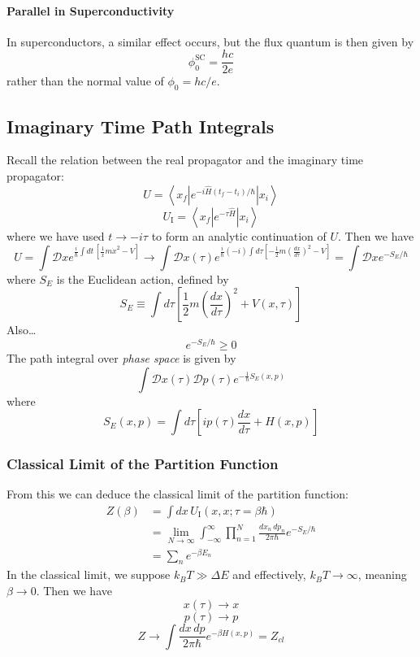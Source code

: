 \documentclass{article}
\begin{document}
	\paragraph{Parallel in Superconductivity} In superconductors, a similar effect occurs, but the flux quantum is then given by
	$$\phi_0^{\mathrm{SC}}=\frac{hc}{2e}$$
	rather than the normal value of $\phi_0=hc/e$.
	\subsection{Imaginary Time Path Integrals}
	Recall the relation between the real propagator and the imaginary time propagator:
	$$U=\left<x_f\left|e^{-i\hat{H}(t_f-t_i)/\hbar}\right|x_i\right>$$
	$$U_{\mathrm{I}}=\left<x_f\left|e^{-\tau\hat{H}}\right|x_i\right>$$
	where we have used $t\to-i\tau$ to form an analytic continuation of $U$. Then we have
	$$U=\int\mathcal{D}xe^{\frac{i}{\hbar}\int dt\,\left[\frac{1}{x}m\dot{x}^2-V\right]}\longrightarrow \int \mathcal{D}x(\tau)e^{\frac{i}{\hbar}(-i)\int d\tau\left[-\frac{1}{2}m\left(\frac{dx}{d\tau}\right)^2-V\right]}=\int \mathcal{D}xe^{-S_E/\hbar}$$
	where $S_E$ is the Euclidean action, defined by
	$$S_E\equiv \int d\tau\left[\frac{1}{2}m\left(\frac{dx}{d\tau}\right)^2+V(x,\tau)\right]$$
	Also\ldots
	$$e^{-S_E/\hbar}\geq 0$$
	The path integral over \emph{phase space} is given by
	$$\int\mathcal{D}x(\tau)\mathcal{D}p(\tau)e^{-\frac{1}{\hbar}S_E(x,p)}$$
	where 
	$$S_E(x,p)=\int d\tau\left[ip(\tau)\frac{dx}{d\tau}+H(x,p)\right]$$
	\subsubsection{Classical Limit of the Partition Function}
	From this we can deduce the classical limit of the partition function:
	\begin{align*}
	Z(\beta)&=\int dx\, U_{\mathrm{I}}(x,x;\tau=\beta\hbar)\\
	&=\lim_{N\to\infty}\int_{-\infty}^\infty \prod_{n=1}^N \frac{dx_n\,dp_n}{2\pi\hbar}e^{-S_E/\hbar}\\
	&=\sum_ne^{-\beta E_n}
	\end{align*}
	In the classical limit, we suppose $k_B T\gg\Delta E$ and effectively, $k_BT\to\infty$, meaning $\beta\to 0$. Then we have
	$$x(\tau)\to x$$
	$$p(\tau)\to p$$
	$$Z\to\int\frac{dx\,dp}{2\pi\hbar}e^{-\beta H(x,p)}=Z_{cl}$$
\end{document}

